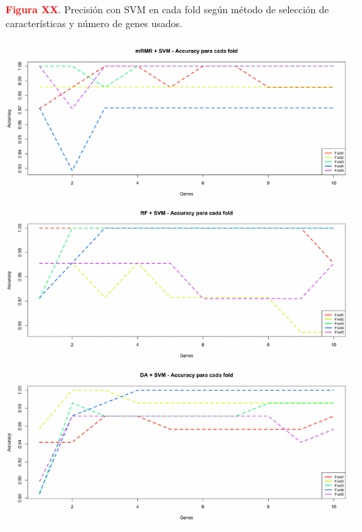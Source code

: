 \newpage
\textbf{\textcolor{red}{Figura XX}}. Precisión con SVM en cada fold según método de selección de características y número de genes usados.
\begin{center}
	\includegraphics[width=.95\textwidth]{figuras/higado_biclase_folds_acc_svm.pdf} \\
\end{center}

